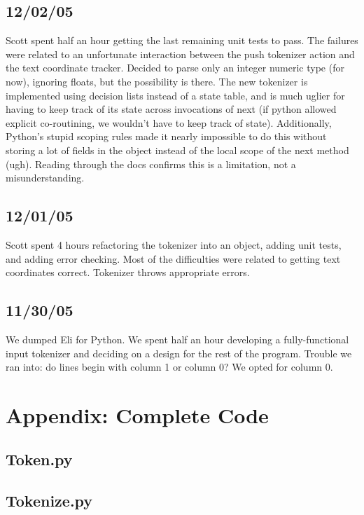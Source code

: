 \documentclass[]{article}
\begin{document}
  \subsection{12/02/05}
  Scott spent half an hour getting the last remaining unit tests to
  pass. The failures were related to an unfortunate interaction between
  the push tokenizer action and the text coordinate tracker. Decided to
  parse only an integer numeric type (for now), ignoring floats, but the
  possibility is there. The new tokenizer is implemented using decision
  lists instead of a state table, and is much uglier for having to keep
  track of its state across invocations of next (if python allowed
  explicit co-routining, we wouldn't have to keep track of state).
  Additionally, Python's stupid scoping rules made it nearly impossible
  to do this without storing a lot of fields in the object instead of
  the local scope of the next method (ugh). Reading through the docs
  confirms this is a limitation, not a misunderstanding.

  \subsection{12/01/05}
  Scott spent 4 hours refactoring the tokenizer into an object, adding
  unit tests, and adding error checking. Most of the difficulties were
  related to getting text coordinates correct. Tokenizer throws
  appropriate errors.
  
  
  \subsection{11/30/05}
  We dumped Eli for Python. We spent half an hour developing a
  fully-functional input tokenizer and deciding on a design for the rest
  of the program. Trouble we ran into: do lines begin with column 1 or
  column 0? We opted for column 0.
  
  \section{Appendix: Complete Code}
  \subsection{Token.py}
  
  \subsection{Tokenize.py}
  
\end{document}
